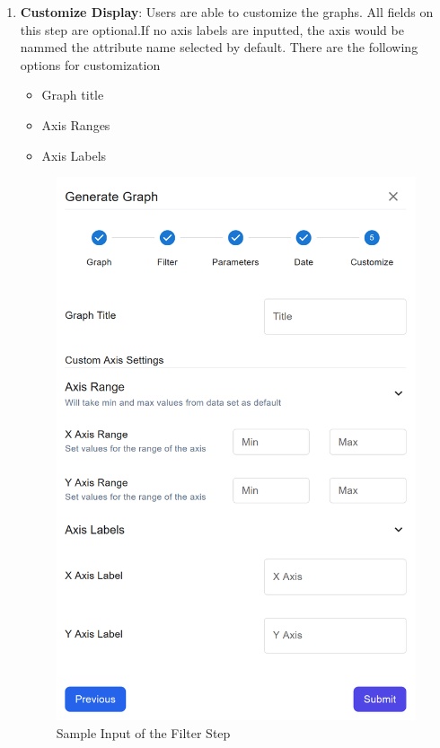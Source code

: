 \documentclass[12pt]{article}
\begin{document}
\begin{enumerate}
    \item \textbf{Customize Display}: \newline
    Users are able to customize the graphs. All fields on this step are
    optional.If no axis labels are inputted, the axis would be nammed the
    attribute name selected by default.
    \newline
    There are the following options for customization
    \begin{itemize}
        \item Graph title
        \item Axis Ranges
        \item Axis Labels
    \end{itemize}
    \begin{figure}[H]
        \centering
        \includegraphics[scale=0.6]{./Diagrams/graph-custom.png}
        \caption{Sample Input of the Filter Step}
        \label{fig:custom}
    \end{figure}
\end{enumerate}
\end{document}
